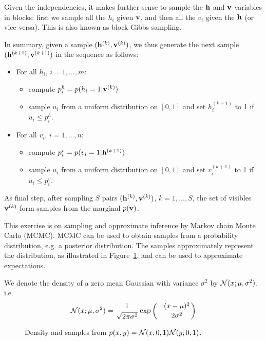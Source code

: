 \begin{solution}
Given the independencies, it makes further sense to sample the $\mathbf{h}$
and $\mathbf{v}$ variables in blocks: first we sample all the $h_i$ given
$\mathbf{v}$, and then all the $v_i$ given the $\mathbf{h}$ (or vice versa). This is
also known as block Gibbs sampling.

In summary, given a sample $(\mathbf{h}^{(k)},\mathbf{v}^{(k)})$, we thus generate the next sample
$(\mathbf{h}^{(k+1)},\mathbf{v}^{(k+1)})$ in the sequence as follows:
\begin{itemize}
\item For all $h_i$, $i=1, \ldots, m$:
  \begin{itemize}
  \item compute $p^h_i = p(h_i=1 | \mathbf{v}^{(k)})$
  \item sample $u_i$ from a uniform distribution on $[0,1]$ and set $h^{(k+1)}_i$ to 1 if $u_i \le p^h_i$.
  \end{itemize}
\item For all $v_i$, $i=1, \ldots, n$:
  \begin{itemize}
  \item compute $p^v_i = p(v_i=1 | \mathbf{h}^{(k+1)})$
  \item sample $u_i$ from a uniform distribution on $[0,1]$ and set $v^{(k+1)}_i$ to 1 if $u_i \le p^v_i$.
  \end{itemize}
\end{itemize}
As final step, after sampling $S$ pairs $(\mathbf{h}^{(k)},\mathbf{v}^{(k)})$, $k=1,
\ldots, S$, the set of visibles $\mathbf{v}^{(k)}$ form samples from the
marginal $p(\mathbf{v})$.
\end{solution}



 \label{q:basic-mcmc}
This exercise is on sampling and approximate inference by Markov
chain Monte Carlo (MCMC). MCMC can be used to obtain
samples from a probability distribution, e.g. a posterior
distribution. The samples approximately represent the distribution, as
illustrated in Figure~\ref{fig:mcmc_approx}, and can be used to
approximate expectations.

We denote the density of a zero mean Gaussian with variance $\sigma^2$ by
$\mathcal{N}(x; \mu, \sigma^2)$, i.e.\
\begin{equation}
  \mathcal{N}(x; \mu, \sigma^2) = \frac{1}{\sqrt{2\pi \sigma^2}}\exp\left(-\frac{(x-\mu)^2}{2\sigma^2}\right)
\end{equation}

\begin{figure}[!h]
	\centering
	\caption{Density and samples from $p(x,y) = \mathcal{N}(x; 0,1)\mathcal{N}(y;0,1)$.}
	\label{fig:mcmc_approx}
\end{figure}

